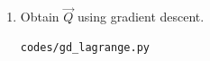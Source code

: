 \begin{enumerate}[label=\arabic*.,ref=\thesection.\theenumi]
%	
\item Obtain $\vec{Q}$ using gradient descent.
\\
\solution
\begin{lstlisting}
codes/gd_lagrange.py
\end{lstlisting}

\end{enumerate}
